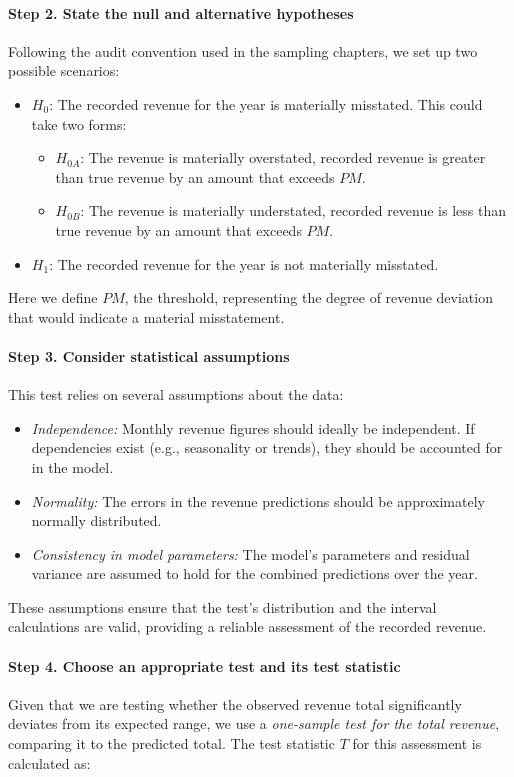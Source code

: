 \paragraph{Step 2. State the null and alternative hypotheses}
Following the audit convention used in the sampling chapters, we set up two possible scenarios:
\begin{itemize}
    \item $H_0$: The recorded revenue for the year is materially misstated. This could take two forms:
    \begin{itemize}
        \item $H_{0A}$: The revenue is materially overstated, recorded revenue is greater than true revenue by an amount that exceeds $PM$.
        \item $H_{0B}$: The revenue is materially understated, recorded revenue is less than true revenue by an amount that exceeds $PM$.
    \end{itemize}
    \item $H_1$: The recorded revenue for the year is not materially misstated.
\end{itemize}
Here we define $PM$, the  threshold, representing the degree of revenue deviation that would indicate a material misstatement.

\paragraph{Step 3. Consider statistical assumptions}
This test relies on several assumptions about the data:
\begin{itemize}
    \item \emph{Independence:} Monthly revenue figures should ideally be independent. If dependencies exist (e.g., seasonality or trends), they should be accounted for in the model.
    \item \emph{Normality:} The errors in the revenue predictions should be ap\-prox\-i\-mate\-ly normally distributed.
    \item \emph{Consistency in model parameters:} The model’s parameters and residual variance are assumed to hold for the combined predictions over the year.
\end{itemize}
These assumptions ensure that the test’s distribution and the interval calculations are valid, providing a reliable assessment of the recorded revenue.

\paragraph{Step 4. Choose an appropriate test and its test statistic}
Given that we are testing whether the observed revenue total significantly deviates from its expected range, we use a \emph{one-sample test for the total revenue}, comparing it to the predicted total. The test statistic $T$ for this assessment is calculated as:


